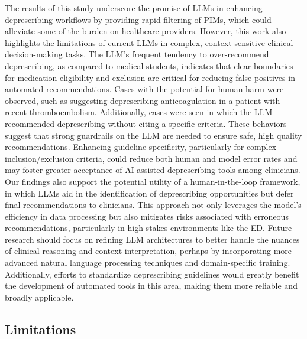 The results of this study underscore the promise of LLMs in enhancing deprescribing workflows by providing rapid filtering of PIMs, which could alleviate some of the burden on healthcare providers. However, this work also highlights the limitations of current LLMs in complex, context-sensitive clinical decision-making tasks. The LLM’s frequent tendency to over-recommend deprescribing, as compared to medical students, indicates that clear boundaries for medication eligibility and exclusion are critical for reducing false positives in automated recommendations. Cases with the potential for human harm were observed, such as suggesting deprescribing anticoagulation in a patient with recent thromboembolism. Additionally, cases were seen in which the LLM recommended deprescribing without citing a specific criteria. These behaviors suggest that strong guardrails on the LLM are needed to ensure safe, high quality recommendations. Enhancing guideline specificity, particularly for complex inclusion/exclusion criteria, could reduce both human and model error rates and may foster greater acceptance of AI-assisted deprescribing tools among clinicians. Our findings also support the potential utility of a human-in-the-loop framework, in which LLMs aid in the identification of deprescribing opportunities but defer final recommendations to clinicians. This approach not only leverages the model’s efficiency in data processing but also mitigates risks associated with erroneous recommendations, particularly in high-stakes environments like the ED. Future research should focus on refining LLM architectures to better handle the nuances of clinical reasoning and context interpretation, perhaps by incorporating more advanced natural language processing techniques and domain-specific training. Additionally, efforts to standardize deprescribing guidelines would greatly benefit the development of automated tools in this area, making them more reliable and broadly applicable.

\subsection{Limitations}

